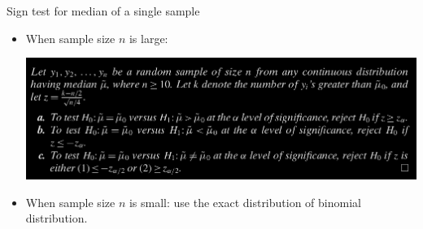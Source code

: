 \begin{frame}[fragile]
{Sign test for median of a single sample}

\begin{itemize}
	\item When sample size $n$ is large:
\begin{center}
\includegraphics[scale=0.3]{./Codes/SignTest_LargeSample.png}
\end{center}
\bigskip
\bigskip

\item When sample size $n$ is small: use the exact distribution of binomial distribution.
\end{itemize}
\end{frame}
